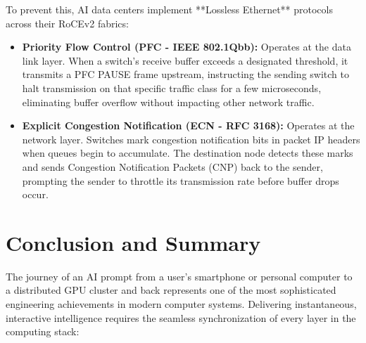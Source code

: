 \documentclass[12pt,a4paper]{report}
\begin{document}
To prevent this, AI data centers implement **Lossless Ethernet** protocols across their RoCEv2 fabrics:
\begin{itemize}[leftmargin=1.2cm]
    \item \textbf{Priority Flow Control (PFC - IEEE 802.1Qbb):} Operates at the data link layer. When a switch's receive buffer exceeds a designated threshold, it transmits a PFC PAUSE frame upstream, instructing the sending switch to halt transmission on that specific traffic class for a few microseconds, eliminating buffer overflow without impacting other network traffic.
    \item \textbf{Explicit Congestion Notification (ECN - RFC 3168):} Operates at the network layer. Switches mark congestion notification bits in packet IP headers when queues begin to accumulate. The destination node detects these marks and sends Congestion Notification Packets (CNP) back to the sender, prompting the sender to throttle its transmission rate before buffer drops occur.
\end{itemize}

\chapter{Conclusion and Summary}

The journey of an AI prompt from a user's smartphone or personal computer to a distributed GPU cluster and back represents one of the most sophisticated engineering achievements in modern computer systems. Delivering instantaneous, interactive intelligence requires the seamless synchronization of every layer in the computing stack:
\end{document}
